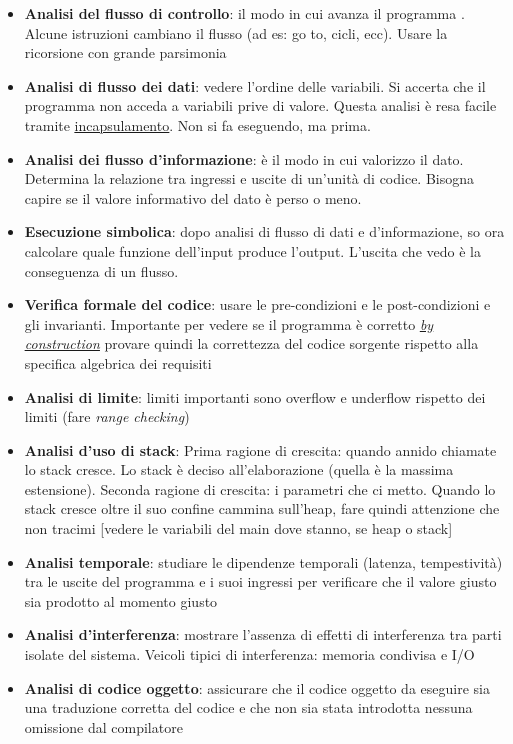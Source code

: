 		\begin{itemize}
			\item \textbf{Analisi del flusso di controllo}: il modo in cui avanza il programma .%
			Alcune istruzioni cambiano il flusso (ad es: go to, cicli, ecc). Usare la ricorsione con grande parsimonia
			\item\textbf{Analisi di flusso dei dati}: vedere l'ordine delle variabili. Si accerta che il programma non acceda a variabili prive di valore. Questa analisi è resa facile tramite \underline{\hyperref[incapsulamento]{incapsulamento}}. Non si fa eseguendo, ma prima.
			\item \textbf{Analisi dei flusso d'informazione}: è il modo in cui valorizzo il dato. Determina la relazione tra ingressi e uscite di un'unità di codice. Bisogna capire se il valore informativo del dato è perso o meno.
			\item \textbf{Esecuzione simbolica}: dopo analisi di flusso di dati e d'informazione, so ora calcolare quale funzione dell'input produce l'output. L'uscita che vedo è la conseguenza di un flusso.
			\item \textbf{Verifica formale del codice}: usare le pre-condizioni e le post-condizioni e gli invarianti. Importante per vedere se il programma è corretto \textit{\underline{\hyperref[byconstruction]{by construction}}} provare quindi la correttezza del codice sorgente rispetto alla specifica algebrica dei requisiti
			\item \textbf{Analisi di limite}: limiti importanti sono overflow e underflow rispetto dei limiti (fare \textit{range checking})
			\item \textbf{Analisi d'uso di stack}: Prima ragione di crescita: quando annido chiamate lo stack cresce. Lo stack è deciso all'elaborazione (quella è la massima estensione). Seconda ragione di crescita: i parametri che ci metto. Quando lo stack cresce oltre il suo confine cammina sull'heap, fare quindi attenzione che non tracimi [vedere le variabili del main dove stanno, se heap o stack]
			\item \textbf{Analisi temporale}: studiare le dipendenze temporali (latenza, tempestività) tra le uscite del programma e i suoi ingressi per verificare che il valore giusto sia prodotto al momento giusto
			\item \textbf{Analisi d'interferenza}: mostrare l’assenza di effetti di interferenza tra parti isolate del sistema. Veicoli tipici di interferenza: memoria condivisa e I/O
			\item \textbf{Analisi di codice oggetto}: assicurare che il codice oggetto da eseguire sia una traduzione corretta del codice e che non sia stata introdotta nessuna omissione dal compilatore
		\end{itemize}


